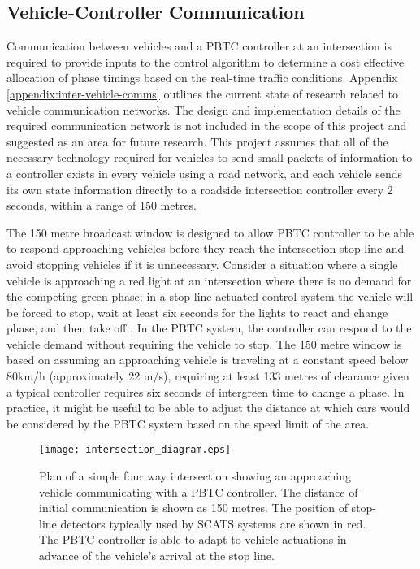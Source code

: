 \subsection{Vehicle-Controller Communication}

Communication between vehicles and a PBTC controller at an intersection is required to provide inputs to the control algorithm to determine a cost effective allocation of phase timings based on the real-time traffic conditions. Appendix \ref{appendix:inter-vehicle-comms} outlines the current state of research related to vehicle communication networks. The design and implementation details of the required communication network is not included in the scope of this project and suggested as an area for future research. This project assumes that all of the necessary technology required for vehicles to send small packets of information to a controller exists in every vehicle using a road network, and each vehicle sends its own state information directly to a roadside intersection controller every 2 seconds, within a range of 150 metres.

The 150 metre broadcast window is designed to allow PBTC controller to be able to respond approaching vehicles before they reach the intersection stop-line and avoid stopping vehicles if it is unnecessary. Consider a situation where a single vehicle is approaching a red light at an intersection where there is no demand for the competing green phase; in a stop-line actuated control system the vehicle will be forced to stop, wait at least six seconds for the lights to react and change phase, and then take off \cite{scatstraining}. In the PBTC system, the controller can respond to the vehicle demand without requiring the vehicle to stop. The 150 metre window is based on assuming an approaching vehicle is traveling at a constant speed below 80km/h (approximately 22 m/s), requiring at least 133 metres of clearance given a typical controller requires six seconds of intergreen time to change a phase. In practice, it might be useful to be able to adjust the distance at which cars would be considered by the PBTC system based on the speed limit of the area. 

\begin{figure}[]
\centering
	\texttt{[image: intersection\_diagram.eps]}
	\caption[Plan of a simple four way intersection showing an approaching vehicle communicating with a traffic controller.]{ Plan of a simple four way intersection showing an approaching vehicle communicating with a PBTC controller. The distance of initial communication is shown as 150 metres. The position of stop-line detectors typically used by SCATS systems are shown in red. The PBTC controller is able to adapt to vehicle actuations in advance of the vehicle's arrival at the stop line. }
\label{intersectiondiagram}
\end{figure}

